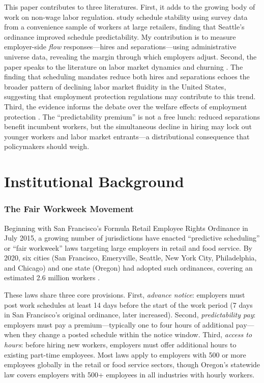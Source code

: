 \documentclass[12pt]{article}
\begin{document}
This paper contributes to three literatures. First, it adds to the growing body of work on non-wage labor regulation. \citet{harknett2021improving} study schedule stability using survey data from a convenience sample of workers at large retailers, finding that Seattle's ordinance improved schedule predictability. My contribution is to measure employer-side \emph{flow} responses---hires and separations---using administrative universe data, revealing the margin through which employers adjust. Second, the paper speaks to the literature on labor market dynamics and churning \citep{davis2014labor, hyatt2013declining}. The finding that scheduling mandates reduce both hires and separations echoes the broader pattern of declining labor market fluidity in the United States, suggesting that employment protection regulations may contribute to this trend. Third, the evidence informs the debate over the welfare effects of employment protection \citep{lazear1990job, autor2003rise}. The ``predictability premium'' is not a free lunch: reduced separations benefit incumbent workers, but the simultaneous decline in hiring may lock out younger workers and labor market entrants---a distributional consequence that policymakers should weigh.

\section{Institutional Background}

\subsubsection*{The Fair Workweek Movement} Beginning with San Francisco's Formula Retail Employee Rights Ordinance in July 2015, a growing number of jurisdictions have enacted ``predictive scheduling'' or ``fair workweek'' laws targeting large employers in retail and food service. By 2020, six cities (San Francisco, Emeryville, Seattle, New York City, Philadelphia, and Chicago) and one state (Oregon) had adopted such ordinances, covering an estimated 2.6 million workers \citep{golden2015irregular}.

These laws share three core provisions. First, \emph{advance notice}: employers must post work schedules at least 14 days before the start of the work period (7 days in San Francisco's original ordinance, later increased). Second, \emph{predictability pay}: employers must pay a premium---typically one to four hours of additional pay---when they change a posted schedule within the notice window. Third, \emph{access to hours}: before hiring new workers, employers must offer additional hours to existing part-time employees. Most laws apply to employers with 500 or more employees globally in the retail or food service sectors, though Oregon's statewide law covers employers with 500+ employees in all industries with hourly workers.
\end{document}
